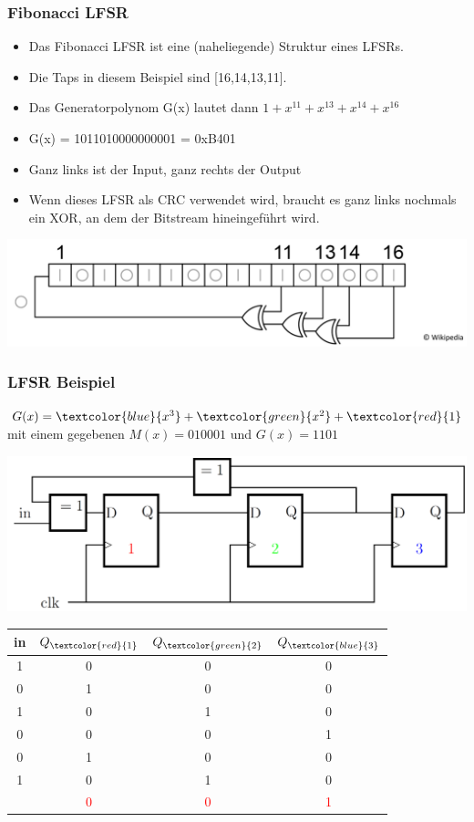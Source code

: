 \subsubsection{Fibonacci LFSR}
\begin{itemize}
	\item Das Fibonacci LFSR ist eine (naheliegende) Struktur eines LFSRs.
	\item Die Taps in diesem Beispiel sind [16,14,13,11].
	\item Das Generatorpolynom G(x) lautet dann $1 + x^{11} + x^{13} + x^{14} + x^{16}$
	\item G(x) = 1011010000000001 = 0xB401
	\item Ganz links ist der Input, ganz rechts der Output
	\item Wenn dieses LFSR als CRC verwendet wird, braucht es ganz links nochmals ein XOR, an dem der Bitstream hineingeführt wird.
\end{itemize}
\includegraphics[width=0.6\linewidth]{images/CRC/lfsr.png}
\subsubsection{LFSR Beispiel}
$G(x)=\textcolor{blue}{x^3}+ \textcolor{green}{x^2} + \textcolor{red}{1}$ mit einem gegebenen $M(x)= 010001$ und $G(x)= 1101$


\begin{minipage}{\linewidth}
	\begin{minipage}[b]{0.7\linewidth}
		\centering
		\includegraphics[width=0.7\linewidth]{images/CRC/ff-LFSR.png} 
	\end{minipage}
	\begin{minipage}[b]{0.29\linewidth}
		\centering
\renewcommand{\arraystretch}{1}

\begin{tabular}{cccc}
	in	& $Q_{\textcolor{red}{1}}$	& $Q_{\textcolor{green}{2}}$	& $Q_{\textcolor{blue}{3}}$	\\
	\hline
	1 	& 	0 	& 	0 	& 	0 	\\
	0 	& 	1 	& 	0 	& 	0 	\\
	1 	& 	0 	& 	1 	& 	0 	\\
	0 	& 	0 	& 	0 	& 	1 	\\
	0 	& 	1 	& 	0 	& 	0 	\\
	1 	& 	0 	& 	1 	& 	0 	\\
	\hline
	& 	\textcolor{red}{0} 	& 	\textcolor{red}{0} 	& 	\textcolor{red}{1}  	\\
\end{tabular}
	\end{minipage}
\end{minipage}


